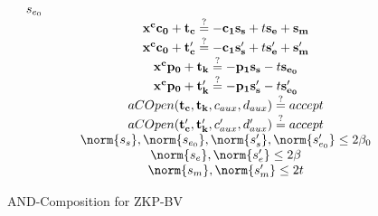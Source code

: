 \begin{figure}[h!]
\begin{equation*}
\begin{array}{c c c}
{{                                 s_{e_0}}\hspace{1em}} & \\
                               & & \mathbf{x^cc_0} + \mathbf{t_c} \stackrel{?}{=} -\mathbf{c_1s_s} + t\mathbf{s_e} + \mathbf{s_m}\\
                               & & \mathbf{x^cc_0} + \mathbf{t'_c} \stackrel{?}{=} -\mathbf{c_1s'_s} + t\mathbf{s'_e} + \mathbf{s'_m}\\
                               & & \mathbf{x^cp_0} + \mathbf{t_k} \stackrel{?}{=} -\mathbf{p_1s_s} - t\mathbf{s_{e_0}}\\
                               & & \mathbf{x^cp_0} + \mathbf{t'_k} \stackrel{?}{=} -\mathbf{p_1s'_s} - t\mathbf{s'_{e_0}}\\
                               & & aCOpen(\mathbf{t_c, t_k}, c_{aux}, d_{aux}) \stackrel{?}{=} accept \\
                               & & aCOpen(\mathbf{t'_c, t'_k}, c'_{aux}, d'_{aux}) \stackrel{?}{=} accept \\
                               & & \norm{s_s}, \norm{s_{e_0}},\norm{s'_s}, \norm{s'_{e_0}} \leq 2\beta_0 \\
                               & & \norm{s_e},\norm{s'_e}  \leq 2\beta \\
                               & & \norm{s_m},\norm{s'_m} \leq 2t
      \end{array}
    \end{equation*}
    \caption{AND-Composition for ZKP-BV }
    \label{fig:belhamoudaProtocolAND}
  \end{figure}


